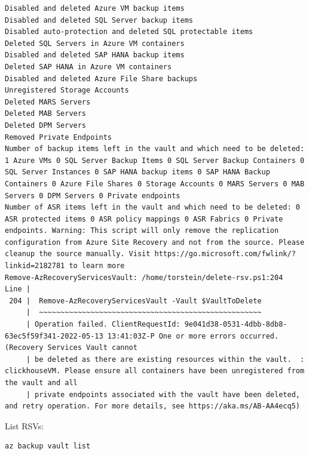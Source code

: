 \begin{verbatim}
Disabled and deleted Azure VM backup items
Disabled and deleted SQL Server backup items
Disabled auto-protection and deleted SQL protectable items
Deleted SQL Servers in Azure VM containers
Disabled and deleted SAP HANA backup items
Deleted SAP HANA in Azure VM containers
Disabled and deleted Azure File Share backups
Unregistered Storage Accounts
Deleted MARS Servers
Deleted MAB Servers
Deleted DPM Servers
Removed Private Endpoints
Number of backup items left in the vault and which need to be deleted: 1 Azure VMs 0 SQL Server Backup Items 0 SQL Server Backup Containers 0 SQL Server Instances 0 SAP HANA backup items 0 SAP HANA Backup Containers 0 Azure File Shares 0 Storage Accounts 0 MARS Servers 0 MAB Servers 0 DPM Servers 0 Private endpoints
Number of ASR items left in the vault and which need to be deleted: 0 ASR protected items 0 ASR policy mappings 0 ASR Fabrics 0 Private endpoints. Warning: This script will only remove the replication configuration from Azure Site Recovery and not from the source. Please cleanup the source manually. Visit https://go.microsoft.com/fwlink/?linkid=2182781 to learn more
Remove-AzRecoveryServicesVault: /home/torstein/delete-rsv.ps1:204
Line |
 204 |  Remove-AzRecoveryServicesVault -Vault $VaultToDelete
     |  ~~~~~~~~~~~~~~~~~~~~~~~~~~~~~~~~~~~~~~~~~~~~~~~~~~~~
     | Operation failed. ClientRequestId: 9e041d38-0531-4dbb-8db8-63ec5f59f341-2022-05-13 13:41:03Z-P One or more errors occurred. (Recovery Services Vault cannot
     | be deleted as there are existing resources within the vault.  : clickhouseVM. Please ensure all containers have been unregistered from the vault and all
     | private endpoints associated with the vault have been deleted, and retry operation. For more details, see https://aka.ms/AB-AA4ecq5)
\end{verbatim}

List RSVs:
\begin{verbatim}
az backup vault list
\end{verbatim}

